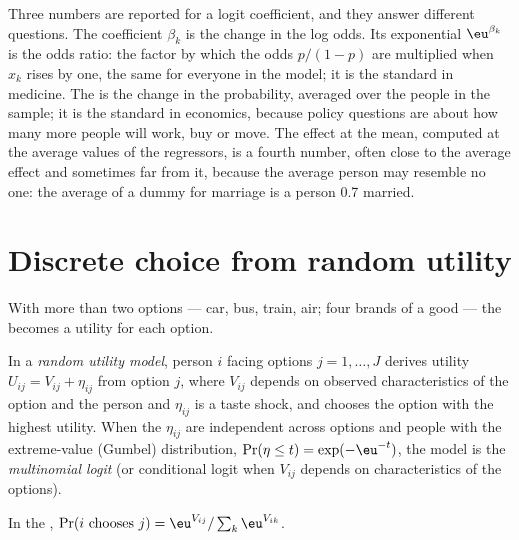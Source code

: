 \begin{measure}
Three numbers are reported for a logit coefficient, and they answer different
questions. The coefficient $\beta_k$ is the change in the log odds. Its
exponential $\eu^{\beta_k}$ is the odds ratio: the factor by which the odds
$p/(1 - p)$ are multiplied when $x_k$ rises by one, the same for everyone in the
model; it is the standard in medicine. The  is the
change in the probability, averaged over the people in the sample; it is the
standard in economics, because policy questions are about how many more
people will work, buy or move. The effect at the mean, computed at the average
values of the regressors, is a fourth number, often close to the average effect
and sometimes far from it, because the average person may resemble no one:
the average of a dummy for marriage is a person 0.7 married.
\end{measure}

\section{Discrete choice from random utility}\label{sec:b3:binary-outcomes:choice}

With more than two options --- car, bus, train, air; four brands of a good ---
the  becomes a utility for each option.

\begin{definition}\label{def:b3:binary-outcomes:random-utility}
In a \emph{random utility model}, person $i$ facing options $j = 1, \dots, J$
derives utility $U_{ij} = V_{ij} + \eta_{ij}$ from option $j$, where $V_{ij}$
depends on observed characteristics of the option and the person and
$\eta_{ij}$ is a taste shock, and chooses the option with the highest utility.
When the $\eta_{ij}$ are independent across options and people with the
extreme-value (Gumbel) distribution, $\Pr(\eta \le t) = \exp(-\eu^{-t})$, the
model is the \emph{multinomial logit} (or conditional logit when $V_{ij}$
depends on characteristics of the options).
\end{definition}

\begin{proposition}\label{prop:b3:binary-outcomes:gumbel}
In the , $\Pr(i \text{ chooses } j) = \eu^{V_{ij}} / \sum_k
\eu^{V_{ik}}$.
\end{proposition}

